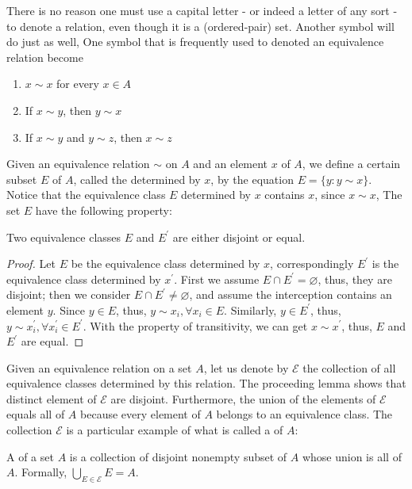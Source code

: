 There is no reason one must use a capital letter  - or indeed a letter of any sort - to denote a relation, even though it is a (ordered-pair) set. Another symbol will do just as well, One symbol that is frequently used to denoted an equivalence relation become 
\begin{enumerate}[itemsep=0pt]
    \item $x \sim x$ for every $x \in A$
    \item If $x \sim y$, then $y \sim x$
    \item If $x \sim y$ and $y \sim z$, then $x \sim z$
\end{enumerate}

Given an equivalence relation $\sim$ on $A$ and an element $x$ of $A$, we define a certain subset $E$ of $A$, called the \textbf{} determined by $x$, by the equation $E = \{y: y \sim x\}$. Notice that the equivalence class $E$ determined by $x$ contains $x$, since $x \sim x$, The set $E$ have the following property:

\begin{lemmad}
Two equivalence classes $E$ and $E^{\prime}$ are either disjoint or equal.
\end{lemmad}
\begin{proof}
Let $E$ be the equivalence class determined by $x$, correspondingly $E^{\prime}$ is the equivalence class determined by $x^{\prime}$. First we assume $E \cap E^{\prime} = \varnothing$, thus, they are disjoint; then we consider $E \cap E^{\prime} \neq \varnothing$, and assume the interception contains an element $y$. Since $y \in E$, thus, $y \sim x_i, \forall x_i \in E$. Similarly, $y \in E^{\prime}$, thus, $y \sim x^{\prime}_i, \forall x^{\prime}_i \in E^{\prime}$. With the property of transitivity, we can get $x \sim x^{\prime}$, thus, $E$ and $E^{\prime}$ are equal.
\end{proof}

Given an equivalence relation on a set $A$, let us denote by $\mathcal{E}$ the collection of all equivalence classes determined by this relation. The proceeding lemma shows that distinct element of $\mathcal{E}$ are disjoint. Furthermore, the union of the elements of $\mathcal{E}$ equals all of $A$ because every element of $A$ belongs to an equivalence class. The collection $\mathcal{E}$ is a particular example of what is called a  of $A$:

\begin{definition}[partition]
A \textbf{} of a set $A$ is a collection of disjoint nonempty subset of $A$ whose union is all of $A$. Formally, $\bigcup_{E \in \mathcal{E}} E = A$.
\end{definition}

